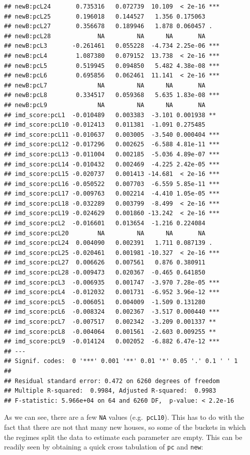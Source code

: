 \documentclass[
]{book}
\begin{document}
\begin{verbatim}
## newB:pcL24       0.735316   0.072739  10.109  < 2e-16 ***
## newB:pcL25       0.196018   0.144527   1.356 0.175063    
## newB:pcL27       0.356678   0.189946   1.878 0.060457 .  
## newB:pcL28             NA         NA      NA       NA    
## newB:pcL3       -0.261461   0.055228  -4.734 2.25e-06 ***
## newB:pcL4        1.087380   0.079152  13.738  < 2e-16 ***
## newB:pcL5        0.519945   0.094850   5.482 4.38e-08 ***
## newB:pcL6        0.695856   0.062461  11.141  < 2e-16 ***
## newB:pcL7              NA         NA      NA       NA    
## newB:pcL8        0.334517   0.059368   5.635 1.83e-08 ***
## newB:pcL9              NA         NA      NA       NA    
## imd_score:pcL1  -0.010489   0.003383  -3.101 0.001938 ** 
## imd_score:pcL10 -0.012413   0.011381  -1.091 0.275485    
## imd_score:pcL11 -0.010637   0.003005  -3.540 0.000404 ***
## imd_score:pcL12 -0.017296   0.002625  -6.588 4.81e-11 ***
## imd_score:pcL13 -0.011004   0.002185  -5.036 4.89e-07 ***
## imd_score:pcL14 -0.010432   0.002469  -4.225 2.42e-05 ***
## imd_score:pcL15 -0.020737   0.001413 -14.681  < 2e-16 ***
## imd_score:pcL16 -0.050522   0.007703  -6.559 5.85e-11 ***
## imd_score:pcL17 -0.009763   0.002214  -4.410 1.05e-05 ***
## imd_score:pcL18 -0.032289   0.003799  -8.499  < 2e-16 ***
## imd_score:pcL19 -0.024629   0.001860 -13.242  < 2e-16 ***
## imd_score:pcL2  -0.016601   0.013654  -1.216 0.224084    
## imd_score:pcL20        NA         NA      NA       NA    
## imd_score:pcL24  0.004090   0.002391   1.711 0.087139 .  
## imd_score:pcL25 -0.020461   0.001981 -10.327  < 2e-16 ***
## imd_score:pcL27  0.006626   0.007561   0.876 0.380911    
## imd_score:pcL28 -0.009473   0.020367  -0.465 0.641850    
## imd_score:pcL3  -0.006935   0.001747  -3.970 7.28e-05 ***
## imd_score:pcL4  -0.012032   0.001731  -6.952 3.96e-12 ***
## imd_score:pcL5  -0.006051   0.004009  -1.509 0.131280    
## imd_score:pcL6  -0.008324   0.002367  -3.517 0.000440 ***
## imd_score:pcL7  -0.007517   0.002342  -3.209 0.001337 ** 
## imd_score:pcL8  -0.004064   0.001561  -2.603 0.009255 ** 
## imd_score:pcL9  -0.014124   0.002052  -6.882 6.47e-12 ***
## ---
## Signif. codes:  0 '***' 0.001 '**' 0.01 '*' 0.05 '.' 0.1 ' ' 1
## 
## Residual standard error: 0.472 on 6260 degrees of freedom
## Multiple R-squared:  0.9984, Adjusted R-squared:  0.9983 
## F-statistic: 5.966e+04 on 64 and 6260 DF,  p-value: < 2.2e-16
\end{verbatim}

As we can see, there are a few \texttt{NA} values (e.g.~\texttt{pcL10}). This has to do with the fact that there are not that many new houses, so some of the buckets in which the regimes split the data to estimate each parameter are empty. This can be readily seen by obtaining a quick cross tabulation of \texttt{pc} and \texttt{new}:
\end{document}
